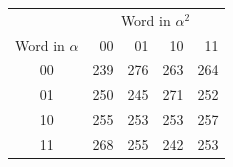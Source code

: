\begin{tabular}{c@{\qquad}rrrr}\toprule
&\multicolumn{4}{c}{Word in $\alpha^2$}\\
Word in $\alpha$ & 00 & 01 & 10 & 11 \\ \midrule
00 & 239 & 276 & 263 & 264 \\
01 & 250 & 245 & 271 & 252 \\
10 & 255 & 253 & 253 & 257 \\
11 & 268 & 255 & 242 & 253 \\
\bottomrule\end{tabular}
